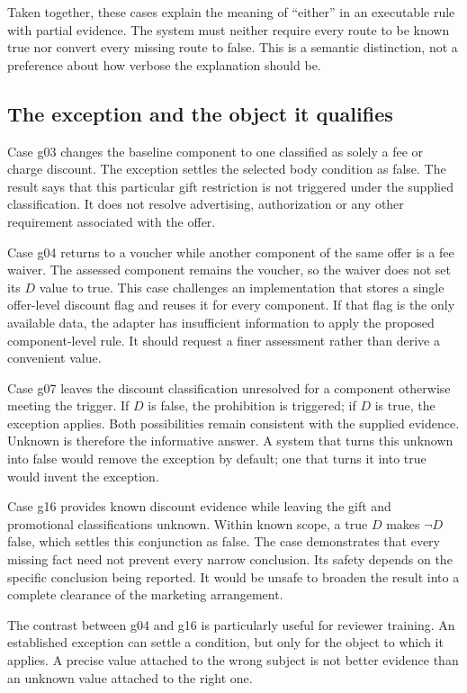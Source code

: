 Taken together, these cases explain the meaning of ``either'' in an executable
rule with partial evidence. The system must neither require every route to be
known true nor convert every missing route to false. This is a semantic
distinction, not a preference about how verbose the explanation should be.

\subsection{The exception and the object it qualifies}
Case g03 changes the baseline component to one classified as solely a fee or
charge discount. The exception settles the selected body condition as false.
The result says that this particular gift restriction is not triggered under
the supplied classification. It does not resolve advertising, authorization or
any other requirement associated with the offer.

Case g04 returns to a voucher while another component of the same offer is a
fee waiver. The assessed component remains the voucher, so the waiver does not
set its $D$ value to true. This case challenges an implementation that stores a
single offer-level discount flag and reuses it for every component. If that flag
is the only available data, the adapter has insufficient information to apply
the proposed component-level rule. It should request a finer assessment rather
than derive a convenient value.

Case g07 leaves the discount classification unresolved for a component otherwise
meeting the trigger. If $D$ is false, the prohibition is triggered; if $D$ is
true, the exception applies. Both possibilities remain consistent with the
supplied evidence. Unknown is therefore the informative answer. A system that
turns this unknown into false would remove the exception by default; one that
turns it into true would invent the exception.

Case g16 provides known discount evidence while leaving the gift and promotional
classifications unknown. Within known scope, a true $D$ makes $\neg D$ false,
which settles this conjunction as false. The case demonstrates that every
missing fact need not prevent every narrow conclusion. Its safety depends on
the specific conclusion being reported. It would be unsafe to broaden the
result into a complete clearance of the marketing arrangement.

The contrast between g04 and g16 is particularly useful for reviewer training.
An established exception can settle a condition, but only for the object to
which it applies. A precise value attached to the wrong subject is not better
evidence than an unknown value attached to the right one.

